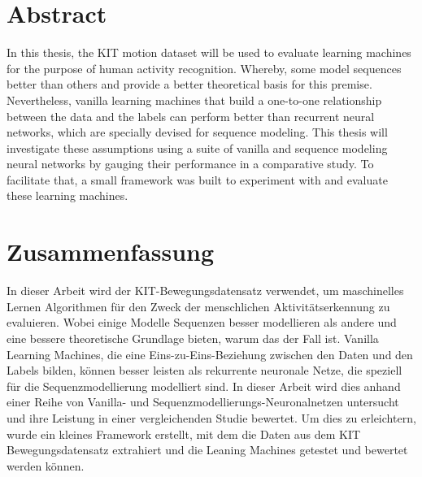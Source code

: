 \section*{Abstract}
	In this thesis, the KIT motion dataset\cite{Plappert2016} will be used to evaluate learning machines for the purpose of human activity recognition. Whereby, some model sequences better than others and provide a better theoretical basis for this premise. Nevertheless, vanilla learning machines that build a one-to-one relationship between the data and the labels can perform better than recurrent neural networks, which are specially devised for sequence modeling. This thesis will investigate these assumptions using a suite of vanilla and sequence modeling neural networks by gauging their performance in a comparative study. To facilitate that, a small framework was built to experiment with and evaluate these learning machines.
\section*{Zusammenfassung}
	In dieser Arbeit wird der KIT-Bewegungsdatensatz\cite{Plappert2016} verwendet, um maschinelles Lernen Algorithmen für den Zweck der menschlichen Aktivitätserkennung zu evaluieren. Wobei einige Modelle Sequenzen besser modellieren als andere und eine bessere theoretische Grundlage bieten, warum das der Fall ist. Vanilla Learning Machines, die eine Eins-zu-Eins-Beziehung zwischen den Daten und den Labels bilden, können besser leisten als rekurrente neuronale Netze, die speziell für die Sequenzmodellierung modelliert sind. In dieser Arbeit wird dies anhand einer Reihe von Vanilla- und Sequenzmodellierungs-Neuronalnetzen untersucht und ihre Leistung in einer vergleichenden Studie bewertet. Um dies zu erleichtern, wurde ein kleines Framework erstellt, mit dem die Daten aus dem KIT Bewegungsdatensatz extrahiert und die Leaning Machines getestet und bewertet werden können. 
